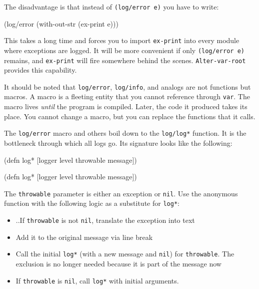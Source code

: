 \fi

\noindent
The disadvantage is that instead of \verb|(log/error e)| you have to write:

\begin{clojure}
(log/error (with-out-str (ex-print e)))
\end{clojure}

This takes a long time and forces you to import \texttt{ex-\-print} into every module where exceptions are logged.
It will be more convenient if only \verb|(log/error e)| remains, and \verb|ex-print| will fire somewhere behind the scenes.
\texttt{Alter-var\--root} provides this capability.

It should be noted that \verb|log/error|, \verb|log/info|, and analogs are not functions but macros.
A macro is a fleeting entity that you cannot reference through \verb|var|.
The macro lives \emph{until} the program is compiled. Later, the code it produced takes its place. You cannot change a macro, but you can replace the functions that it calls.


The \verb|log/error| macro and others boil down to the \verb|log/log*| function.
It is the bottleneck through which all logs go.
Its signature looks like the following:

\ifx\DEVICETYPE\MOBILE

\begin{clojure}
(defn log*
  [logger level throwable message])
\end{clojure}

\else

\begin{clojure}
(defn log* [logger level throwable message])
\end{clojure}

\fi

The \verb|throwable| parameter is either an exception or \verb|nil|.
Use the anonymous function with the following logic as a substitute for \verb|log*|:

\begin{itemize}

\item

..If \verb|throwable| is not \verb|nil|, translate the exception into text

\item
  Add it to the original message via line break

\item
  Call the initial \verb|log*| (with a new message and \verb|nil|) for \verb|throwable|.
The exclusion is no longer needed because it is part of the message now

\item
  If \verb|throwable| is \verb|nil|, call \verb|log*| with initial arguments.

\end{itemize}

